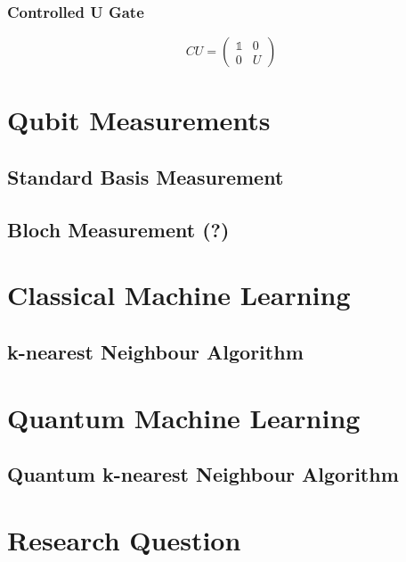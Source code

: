 \subsubsection{Controlled U Gate}
\label{subsubsubsec:controlledugate}

\begin{equation}
CU = \begin{pmatrix}
 \mathbb{1} & 0 \\ 
 0 & U
 \end{pmatrix}
\end{equation}


\section{Qubit Measurements}
\label{subsec:qubitmeasurements}

\subsection{Standard Basis Measurement}
\label{subsubsec:standardbasismeasurement}

\subsection{Bloch Measurement (?)}
\label{subsubsec:blochmeasurement}



\section{Classical Machine Learning}
\label{subsec:classicalmachinelearning}

\subsection{k-nearest Neighbour Algorithm}
\label{subsubsec:knearestneighbour}

\section{Quantum Machine Learning}
\label{subsec:quantummachinelearning}

\subsection{Quantum k-nearest Neighbour Algorithm}
\label{subsubsec:quantumknearestneighbour}

\section{Research Question}
\label{subsec:researchquestion}